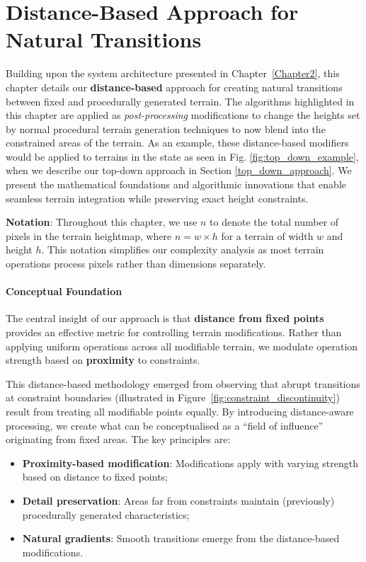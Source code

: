 \chapter{Distance-Based Approach for Natural Transitions}
\label{Chapter3}

Building upon the system architecture presented in Chapter~\ref{Chapter2}, this chapter details our \textbf{distance-based} approach for creating natural transitions between fixed and procedurally generated terrain. The algorithms highlighted in this chapter are applied as \textit{post-processing} modifications to change the heights set by normal procedural terrain generation techniques to now blend into the constrained areas of the terrain. As an example, these distance-based modifiers would be applied to terrains in the state as seen in Fig. \ref{fig:top_down_example}, when we describe our top-down approach in Section \ref{top_down_approach}. We present the mathematical foundations and algorithmic innovations that enable seamless terrain integration while preserving exact height constraints. 

\textbf{Notation}: Throughout this chapter, we use $n$ to denote the total number of pixels in the terrain heightmap, where $n = w \times h$ for a terrain of width $w$ and height $h$. This notation simplifies our complexity analysis as most terrain operations process pixels rather than dimensions separately.

\subsubsection{Conceptual Foundation}

The central insight of our approach is that \textbf{distance from fixed points} provides an effective metric for controlling terrain modifications. Rather than applying uniform operations across all modifiable terrain, we modulate operation strength based on \textbf{proximity} to constraints.

This distance-based methodology emerged from observing that abrupt transitions at constraint boundaries (illustrated in Figure~\ref{fig:constraint_discontinuity}) result from treating all modifiable points equally. By introducing distance-aware processing, we create what can be conceptualised as a ``field of influence'' originating from fixed areas. The key principles are:


\begin{itemize}
    \sloppy
    \item \textbf{Proximity-based modification}: Modifications apply with varying strength based on distance to fixed points;
    \item \textbf{Detail preservation}: Areas far from constraints maintain (previously) procedurally generated characteristics;
    \item \textbf{Natural gradients}: Smooth transitions emerge from the distance-based modifications.
\end{itemize}


